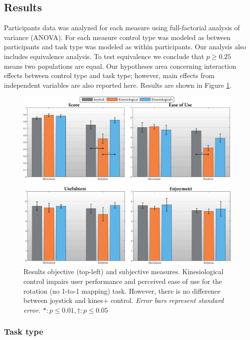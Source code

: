 \documentclass{sigchi}
\begin{document}
\subsection{Results}

Participants data was analyzed for each measure using full-factorial analysis of variance (ANOVA). For each measure control type was modeled as between participants and task type was modeled as within participants. Our analysis also includes equivalence analysis. To test equivalence we conclude that $p\geq0.25$ means two populations are equal. Our hypotheses area concerning interaction effects between control type and task type; however, main effects from independent variables are also reported here. Results are shown in Figure \ref{fig:bar_chart}.

\begin{figure}[t]
	\centering
	\includegraphics[width=\columnwidth]{figures/bar_charts.pdf}
	\caption{Results objective (top-left) and subjective measures. Kinesiological control impairs user performance and perceived ease of use for the rotation (no 1-to-1 mapping) task. However, there is no difference between joystick and kines+ control. \em{Error bars represent standard error.} $\ast: p \leq 0.01, \dagger:p \leq 0.05 $ }
	\label{fig:bar_chart}
\end{figure} 

\subsubsection{Task type}
\end{document}

